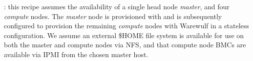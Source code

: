 : this recipe assumes the availability of a single head node
{\em master}, and four {\em compute} nodes. The {\em master} node is
provisioned with \baseOS{} and is subsequently configured to
provision the remaining {\em compute} nodes with Warewulf in a
stateless configuration. We assume an external \$HOME file system is
available for use on both the master and compute nodes via NFS, and that compute node BMCs are
available via IPMI from the chosen master host. \\


